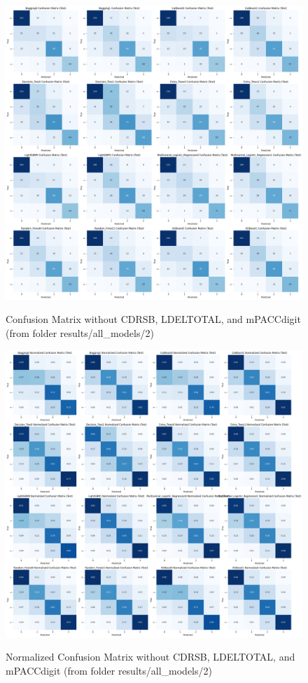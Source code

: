 \newpage

\begin{figure}[H]
	\centering
	\includegraphics[width=1\textwidth]{images/2_Confusion_Matrix.png}
	\label{fig:Confusion Matrix without CDRSB, LDELTOTAL, and mPACCdigit}
	\caption{Confusion Matrix without CDRSB, LDELTOTAL, and mPACCdigit (from folder results/all\_models/2)}
\end{figure} 

\newpage

\begin{figure}[H]
	\centering
	\includegraphics[width=1\textwidth]{images/2_Confusion_Matrix_Normalized.png}
	\label{fig:Normalized Confusion Matrix without CDRSB, LDELTOTAL, and mPACCdigit}
	\caption{Normalized Confusion Matrix without CDRSB, LDELTOTAL, and mPACCdigit (from folder results/all\_models/2)}
\end{figure}

